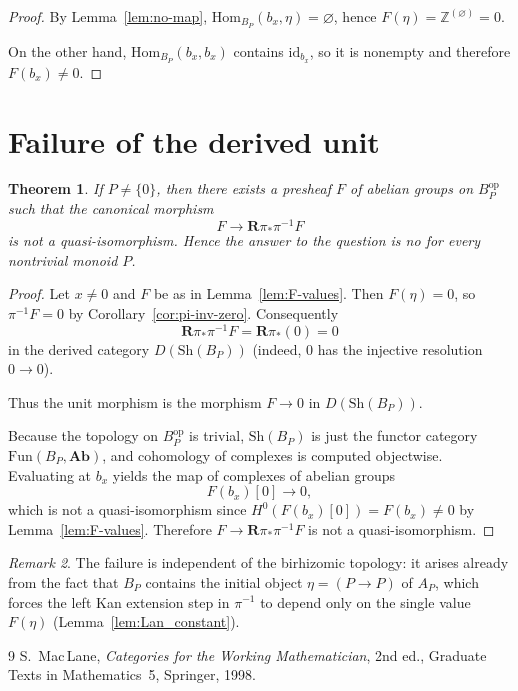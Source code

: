 \documentclass[11pt]{article}
\newtheorem{theorem}{Theorem}
\theoremstyle{remark}
\newtheorem{remark}[theorem]{Remark}
\begin{document}
\begin{proof}
By Lemma~\ref{lem:no-map}, $\mathrm{Hom}_{B_P}(b_x,\eta)=\varnothing$, hence
$F(\eta)=\mathbb{Z}^{(\varnothing)}=0$.

On the other hand, $\mathrm{Hom}_{B_P}(b_x,b_x)$ contains $\mathrm{id}_{b_x}$, so it is nonempty
and therefore $F(b_x)\neq 0$.
\end{proof}

\section{Failure of the derived unit}

\begin{theorem}\label{thm:main}
If $P\neq\{0\}$, then there exists a presheaf $F$ of abelian groups on $B_P^{\mathrm{op}}$ such that
the canonical morphism
\[
F \longrightarrow \mathbf{R}\pi_*\pi^{-1}F
\]
is \emph{not} a quasi-isomorphism. Hence the answer to the question is \emph{no} for every
nontrivial monoid $P$.
\end{theorem}

\begin{proof}
Let $x\neq 0$ and $F$ be as in Lemma~\ref{lem:F-values}. Then $F(\eta)=0$, so
$\pi^{-1}F=0$ by Corollary~\ref{cor:pi-inv-zero}. Consequently
\[
\mathbf{R}\pi_*\pi^{-1}F = \mathbf{R}\pi_*(0)=0
\]
in the derived category $D(\mathrm{Sh}(B_P))$ (indeed, $0$ has the injective resolution $0\to 0$).

Thus the unit morphism is the morphism $F\to 0$ in $D(\mathrm{Sh}(B_P))$.

Because the topology on $B_P^{\mathrm{op}}$ is trivial, $\mathrm{Sh}(B_P)$ is just the functor
category $\mathrm{Fun}(B_P,\mathbf{Ab})$, and cohomology of complexes is computed objectwise.
Evaluating at $b_x$ yields the map of complexes of abelian groups
\[
F(b_x)[0] \longrightarrow 0,
\]
which is not a quasi-isomorphism since $H^0(F(b_x)[0])=F(b_x)\neq 0$ by Lemma~\ref{lem:F-values}.
Therefore $F\to \mathbf{R}\pi_*\pi^{-1}F$ is not a quasi-isomorphism.
\end{proof}

\begin{remark}
The failure is independent of the birhizomic topology: it arises already from the fact that
$B_P$ contains the initial object $\eta=(P\to P)$ of $A_P$, which forces the left Kan
extension step in $\pi^{-1}$ to depend only on the single value $F(\eta)$
(Lemma~\ref{lem:Lan_constant}).
\end{remark}

\begin{thebibliography}{9}
S.~Mac\,Lane,
\emph{Categories for the Working Mathematician},
2nd ed., Graduate Texts in Mathematics~5, Springer, 1998.
\end{thebibliography}
\end{document}
